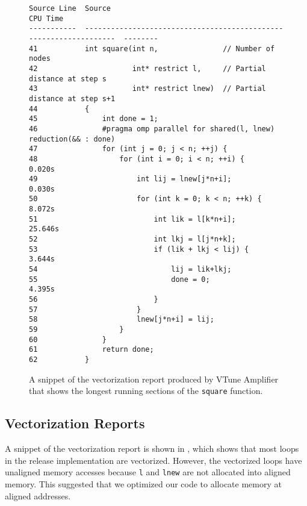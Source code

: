 \begin{figure}[h]
{
\scriptsize
\begin{BVerbatim}
Source Line  Source                                                              CPU Time
-----------  ------------------------------------------------------------------  --------
41           int square(int n,               // Number of nodes
42                      int* restrict l,     // Partial distance at step s
43                      int* restrict lnew)  // Partial distance at step s+1
44           {
45               int done = 1;
46               #pragma omp parallel for shared(l, lnew) reduction(&& : done)
47               for (int j = 0; j < n; ++j) {
48                   for (int i = 0; i < n; ++i) {                                 0.020s
49                       int lij = lnew[j*n+i];                                    0.030s
50                       for (int k = 0; k < n; ++k) {                             8.072s
51                           int lik = l[k*n+i];                                  25.646s
52                           int lkj = l[j*n+k];
53                           if (lik + lkj < lij) {                                3.644s
54                               lij = lik+lkj;
55                               done = 0;                                         4.395s
56                           }
57                       }
58                       lnew[j*n+i] = lij;
59                   }
60               }
61               return done;
62           }
\end{BVerbatim}
}
\caption{%
  A snippet of the vectorization report produced by VTune Amplifier that shows
  the longest running sections of the \texttt{square} function.
}
\label{fig:vtune-b}
\end{figure}

\subsection{Vectorization Reports}
A snippet of the \icc{} vectorization report is shown in
, which shows that most loops in the release
implementation are vectorized. However, the vectorized loops have unaligned
memory accesses because \texttt{l} and \texttt{lnew} are not allocated into
aligned memory. This suggested that we optimized our code to allocate memory
at aligned addresses.


